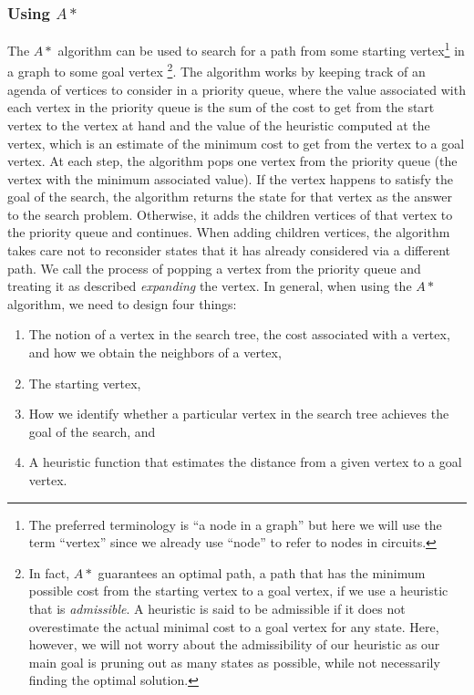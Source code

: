 \subsubsection{Using $A*$}

The $A*$ algorithm can be used to search for a path from some starting
vertex\footnote{The preferred terminology is ``a node in a graph'' but here we
will use the term ``vertex'' since we already use ``node'' to refer to nodes in
circuits.} in
a graph to some goal vertex \footnote{In fact, $A*$ guarantees an optimal path, a
path that has the minimum possible cost from the starting vertex to a goal
vertex, if we use a heuristic that is \emph{admissible}. A heuristic is said to
be admissible if it does not overestimate the actual minimal cost to a goal
vertex
for any state. Here, however, we will not worry about the admissibility of our
heuristic as our main goal is pruning out as many states as possible, while not
necessarily finding the optimal solution.}.
The algorithm works by keeping track of an agenda
of vertices to consider
in a priority queue, where the value associated with each vertex in the priority
queue is the sum of the cost to get from the start vertex to the vertex at hand
and the value of the heuristic
computed at the vertex, which is an estimate of the minimum
cost to get from the vertex to a goal vertex.
At each step, the algorithm pops
one vertex from the priority queue (the vertex with the minimum associated
value). If the vertex happens to satisfy the goal of
the search, the algorithm returns the state for that vertex as the answer to
the search
problem. Otherwise, it adds the children vertices of that vertex to the priority
queue and continues. When adding children vertices, the algorithm takes care not
to reconsider
states that it has already considered via a different path. We call the process
of popping a vertex from the priority queue and treating it as described
\emph{expanding} the vertex.
In general, when using the $A*$ algorithm, we need to design four things:

\begin{enumerate}
\item The notion of a vertex in the
search tree, the cost associated with a vertex, and how we obtain the neighbors
of a vertex,
\item The starting vertex,
\item How we identify whether a particular vertex in the search tree achieves
the goal of the search, and
\item A heuristic function that estimates the distance from a given vertex to a
goal vertex.
\end{enumerate}

